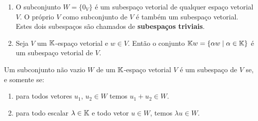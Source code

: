 \begin{exemplo}
	\begin{enumerate}[label={\arabic*})]
		\item O subconjunto $W = \{0_V\}$ \'e um subespa\c{c}o vetorial de qualquer espa\c{c}o vetorial $V$. O pr\'oprio $V$ como subconjunto de $V$ \'e tamb\'em um subespa\c{c}o vetorial. Estes dois subespa\c{c}os s\~ao chamados de \textbf{subespa\c{c}os triviais}.
		\item Seja $V$ um $\mathbb{K}$-espa\c{c}o vetorial e $w \in V$. Ent\~ao o conjunto $\mathbb{K}w = \{\alpha w \mid \alpha \in \mathbb{K}\}$ \'e um subespa\c{c}o vetorial de $V$.
	\end{enumerate}
\end{exemplo}

\begin{teorema}\label{teoremasubespaco}
	Um subconjunto n\~ao vazio $W$ de um $\mathbb{K}$-espa\c{c}o vetorial $V$ \'e um subespa\c{c}o de $V$ se, e somente se:
	\begin{enumerate}[label={\roman*})]
		\item para todos vetores $u_1$, $u_2 \in W$ temos $u_1 + u_2 \in W$.
		\item para todo escalar $\lambda \in \mathbb{K}$ e todo vetor $u \in W$, temos $\lambda u\in W$.
	\end{enumerate}
\end{teorema}

